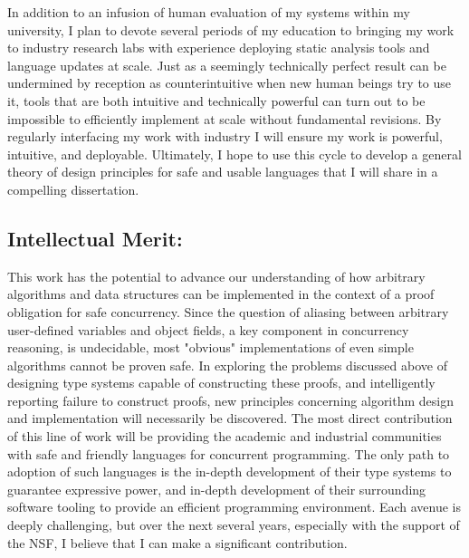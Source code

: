 \documentclass{nsf-grfp}
\begin{document}
In addition to an infusion of human evaluation of my systems within my university, I plan to devote several periods of my education to bringing my work to industry research labs with experience deploying static analysis tools and language updates at scale. Just as a seemingly technically perfect result can be undermined by reception as counterintuitive when new human beings try to use it, tools that are both intuitive and technically powerful can turn out to be impossible to efficiently implement at scale without fundamental revisions. By regularly interfacing my work with industry I will ensure my work is powerful, intuitive, and deployable. Ultimately, I hope to use this cycle to develop a general theory of design principles for safe and usable languages that I will share in a compelling dissertation.


\subsection*{Intellectual Merit:} This work has the potential to advance our understanding of how arbitrary algorithms and data structures can be implemented in the context of a proof obligation for safe concurrency. Since the question of aliasing between arbitrary user-defined variables and object fields, a key component in concurrency reasoning, is undecidable, most "obvious" implementations of even simple algorithms cannot be proven safe. In exploring the problems discussed above of designing type systems capable of constructing these proofs, and intelligently reporting failure to construct proofs, new principles concerning algorithm design and implementation will necessarily be discovered. The most direct contribution of this line of work will be providing the academic and industrial communities with safe and friendly languages for concurrent programming. The only path to adoption of such languages is the in-depth development of their type systems to guarantee expressive power, and in-depth development of their surrounding software tooling to provide an efficient programming environment. Each avenue is deeply challenging, but over the next several years, especially with the support of the NSF, I believe that I can make a significant contribution.
\end{document}

